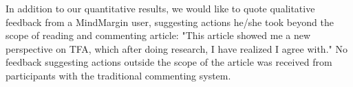 
In addition to our quantitative results, we would like to quote qualitative feedback from a MindMargin user, suggesting actions he/she took beyond the scope of reading and commenting article: "This article showed me a new perspective on TFA, which after doing research, I have realized I agree with." No feedback suggesting actions outside the scope of the article was received from participants with the traditional commenting system. 